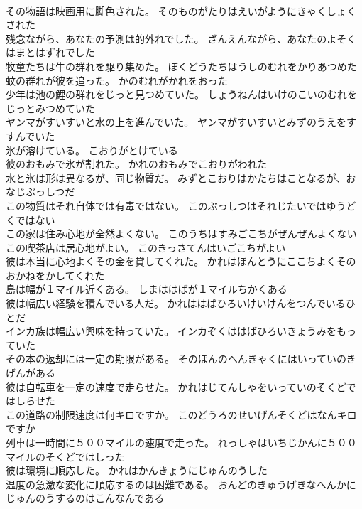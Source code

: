 \documentclass[8pt]{extreport}
\begin{document}
\begin{CJK}{UTF8}{min}
\\	その物語は映画用に脚色された。	そのものがたりはえいがようにきゃくしょくされた 
\\	残念ながら、あなたの予測は的外れでした。	ざんえんながら、あなたのよそくはまとはずれでした 
\\	牧童たちは牛の群れを駆り集めた。	ぼくどうたちはうしのむれをかりあつめた 
\\	蚊の群れが彼を追った。	かのむれがかれをおった 
\\	少年は池の鯉の群れをじっと見つめていた。	しょうねんはいけのこいのむれをじっとみつめていた 
\\	ヤンマがすいすいと水の上を進んでいた。	ヤンマがすいすいとみずのうえをすすんでいた 
\\	氷が溶けている。	こおりがとけている 
\\	彼のおもみで氷が割れた。	かれのおもみでこおりがわれた 
\\	水と氷は形は異なるが、同じ物質だ。	みずとこおりはかたちはことなるが、おなじぶっしつだ 
\\	この物質はそれ自体では有毒ではない。	このぶっしつはそれじたいではゆうどくではない 
\\	この家は住み心地が全然よくない。	このうちはすみごこちがぜんぜんよくない 
\\	この喫茶店は居心地がよい。	このきっさてんはいごこちがよい 
\\	彼は本当に心地よくその金を貸してくれた。	かれはほんとうにここちよくそのおかねをかしてくれた 
\\	島は幅が１マイル近くある。	しまははばが１マイルちかくある 
\\	彼は幅広い経験を積んでいる人だ。	かれははばひろいけいけんをつんでいるひとだ 
\\	インカ族は幅広い興味を持っていた。	インカぞくははばひろいきょうみをもっていた 
\\	その本の返却には一定の期限がある。	そのほんのへんきゃくにはいっていのきげんがある 
\\	彼は自転車を一定の速度で走らせた。	かれはじてんしゃをいっていのそくどではしらせた 
\\	この道路の制限速度は何キロですか。	このどうろのせいげんそくどはなんキロですか 
\\	列車は一時間に５００マイルの速度で走った。	れっしゃはいちじかんに５００マイルのそくどではしった 
\\	彼は環境に順応した。	かれはかんきょうにじゅんのうした 
\\	温度の急激な変化に順応するのは困難である。	おんどのきゅうげきなへんかにじゅんのうするのはこんなんである 

\end{CJK}
\end{document}

